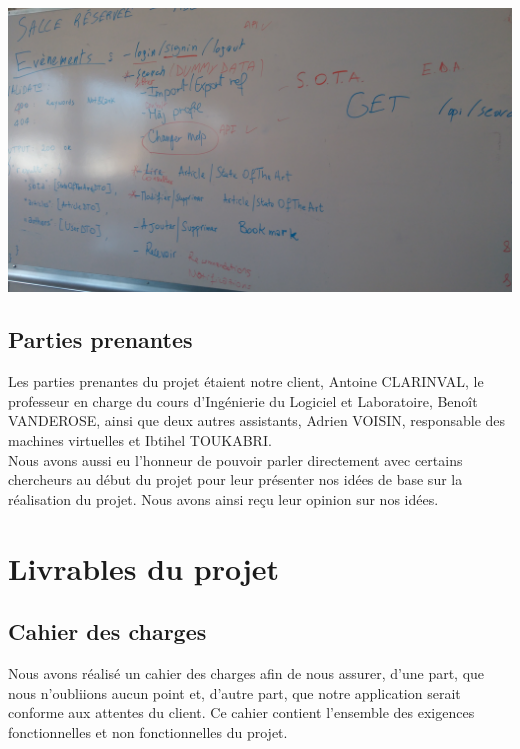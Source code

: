 \documentclass[t, 12pt, usenames,dvipsnames]{article}
\begin{document}
            \begin{center}                               
                \includegraphics[scale=.08]{images/sprint/exemple-tableau.jpg}
                \label{fig:tableau_todo}
            \end{center}
            
        \newpage
        
        \subsection{Parties prenantes}
            \noindent Les parties prenantes du projet étaient notre client, Antoine CLARINVAL, le professeur en charge du cours d'Ingénierie du Logiciel et Laboratoire, Benoît VANDEROSE, ainsi que deux autres assistants, Adrien VOISIN, responsable des machines virtuelles et Ibtihel TOUKABRI.\\
            Nous avons aussi eu l'honneur de pouvoir parler directement avec certains chercheurs au début du projet pour leur présenter nos idées de base sur la réalisation du projet. Nous avons ainsi reçu leur opinion sur nos idées.


    \section{Livrables du projet}
        
        \subsection{Cahier des charges}
            \noindent Nous avons réalisé un cahier des charges afin de nous assurer, d'une part, que nous n'oubliions aucun point et, d'autre part, que notre application serait conforme aux attentes du client. Ce cahier contient l'ensemble des exigences fonctionnelles et non fonctionnelles du projet.
            
\end{document}
